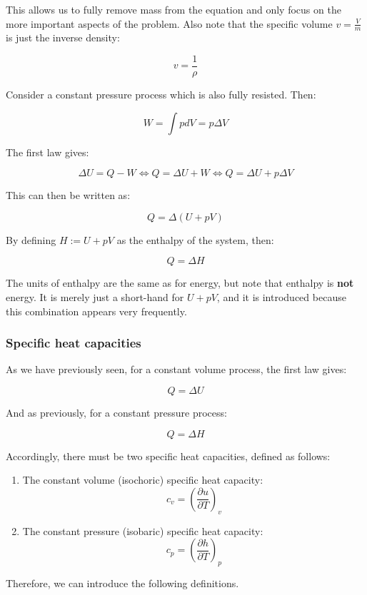 \documentclass{article}
\begin{document}
This allows us to fully remove mass from the equation and only focus on the more important aspects of the problem. Also note that the specific volume $v = \frac{V}{m}$ is just the inverse density:

\[ v = \frac{1}{\rho} \]

\begin{definition}[Enthalpy]
    Consider a constant pressure process which is also fully resisted. Then:

    \[ W = \int pdV = p\Delta V \]

    The first law gives:

    \[ \Delta U = Q - W \iff Q = \Delta U + W \iff Q = \Delta U + p\Delta V \]

    This can then be written as:

    \[ Q = \Delta (U + pV) \]

    By defining $H := U + pV$ as the enthalpy of the system, then:

    \[ Q = \Delta H \]
\end{definition}

The units of enthalpy are the same as for energy, but note that enthalpy is \textbf{not} energy. It is merely just a short-hand for $U + pV$, and it is introduced because this combination appears very frequently.

\subsubsection{Specific heat capacities}

As we have previously seen, for a constant volume process, the first law gives:

\[ Q = \Delta U \]

And as previously, for a constant pressure process:

\[ Q = \Delta H \]

Accordingly, there must be two specific heat capacities, defined as follows:

\begin{enumerate}
    \item The constant volume (isochoric) specific heat capacity:
    \[ c_v = \left(\frac{\partial u}{\partial T}\right)_v \]
    \item The constant pressure (isobaric) specific heat capacity:
    \[ c_p = \left(\frac{\partial h}{\partial T}\right)_p \]
\end{enumerate}

Therefore, we can introduce the following definitions.
\end{document}
